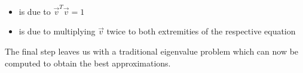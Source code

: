 \vspace{-10mm}

\begin{itemize}
	\item {} is due to $\overrightarrow{v}^T \overrightarrow{v} = 1$
	\item {} is due to multiplying $\overrightarrow{v}$ twice to both extremities of the respective equation
\end{itemize}
	
\noindent The final step  leaves us with a traditional eigenvalue problem which can now be computed to obtain the best approximations.




\clearpage

